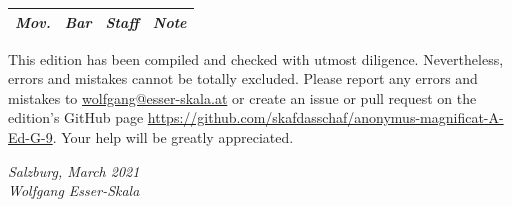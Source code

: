 \documentclass[parskip=full]{scrreprt}
\newif\iftemplate\templatetrue
\begin{document}
\bigskip

\begin{longtable}{lll L{10cm}}
	\toprule
	\itshape Mov. & \itshape Bar & \itshape Staff & \itshape Note \\
	\midrule \endhead
	
	\bottomrule
\end{longtable}


This edition has been compiled and checked with utmost diligence. Nevertheless, errors and mistakes cannot be totally excluded. Please report any errors and mistakes to \url{wolfgang@esser-skala.at} or create an issue or pull request on the edition’s GitHub page \url{https://github.com/skafdasschaf/anonymus-magnificat-A-Ed-G-9}. Your help will be greatly appreciated.

\bigskip
\textit{Salzburg, March 2021\\
Wolfgang Esser-Skala}

\cleardoublepage
\fi

\iftemplate

\fi
\end{document}
